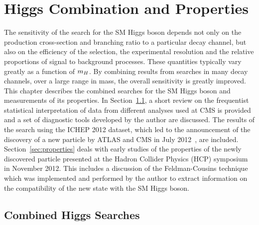 \chapter{Higgs Combination and Properties}
\label{chap:combinations}

The sensitivity 
of the search for the SM Higgs boson depends not only on the production cross-section and 
branching ratio to a particular decay channel, but also on the efficiency
of the selection, the experimental resolution and the relative proportions of 
signal to background processes. These quantities typically vary greatly as a function of 
$m_{H}$. By combining results from searches
in many decay channels, over a large range in mass, 
the overall sensitivity is greatly improved.
This chapter describes the combined searches for the SM Higgs boson and measurements of its properties. 
In Section~\ref{sec:combinationmethodology}, a short review on the frequentist statistical 
interpretation of data from different analyses used at CMS is provided and a set of diagnostic
tools developed by the author are discussed.
The results of the search using the ICHEP 2012 dataset, 
which led to the announcement of the discovery of a new particle 
by ATLAS and CMS in July 2012~\citep{HIG-12-028}, are included.
Section~\ref{sec:properties} deals with early studies of the 
properties of the newly discovered particle presented at the Hadron Collider Physics (HCP) 
symposium in November 2012. This includes a discussion of 
the Feldman-Cousins technique which was implemented and performed
by the author to extract information on the compatibility of the new 
state with the SM Higgs boson.

\section{Combined Higgs Searches}
\label{sec:combinationmethodology}

